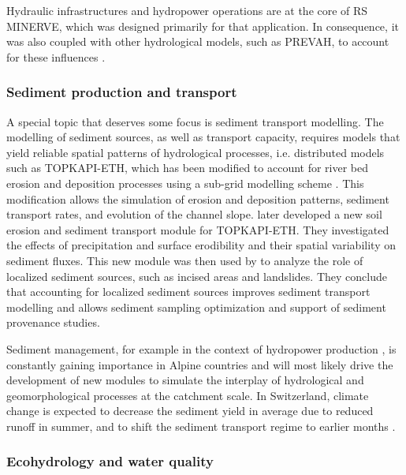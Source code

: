 \documentclass[10pt,a4paper]{article}
\begin{document}
Hydraulic infrastructures and hydropower operations are at the core of RS MINERVE, which was designed primarily for that application. In consequence, it was also coupled with other hydrological models, such as PREVAH, to account for these influences \citep{Andres2016, Stucki2018}.
 

\subsubsection{Sediment production and transport}
\label{sec:application:sediments}

A special topic that deserves some focus is sediment transport modelling. The modelling of sediment sources, as well as transport capacity, requires models that yield reliable spatial patterns of hydrological processes, i.e. distributed models such as TOPKAPI-ETH, which has been modified to account for river bed erosion and deposition processes using a sub-grid modelling scheme \citep{Konz2011}. This modification allows the simulation of erosion and deposition patterns, sediment transport rates, and evolution of the channel slope. \citet{Battista2020a} later developed a new soil erosion and sediment transport module for TOPKAPI-ETH. They investigated the effects of precipitation and surface erodibility and their spatial variability on sediment fluxes. This new module was then used by \citet{Battista2020} to analyze the role of localized sediment sources, such as incised areas and landslides. They conclude that accounting for localized sediment sources improves sediment transport modelling and allows sediment sampling optimization and support of sediment provenance studies.

Sediment management, for example in the context of hydropower production \citep{RaymondPralong2015,Gabbud2016}, is constantly gaining importance in Alpine countries and will most likely drive the development of new modules to simulate the interplay of hydrological and geomorphological processes at the catchment scale. In Switzerland, climate change is expected to decrease the sediment yield in average due to reduced runoff in summer, and to shift the sediment transport regime to earlier months \citep[as found by ][using PREVAH]{RaymondPralong2015}.


\subsubsection{Ecohydrology and water quality}
\label{sec:application:ecohydrology}
\end{document}
